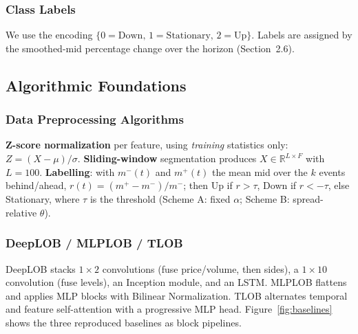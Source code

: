 \documentclass[11pt]{article}
\begin{document}
\subsubsection{Class Labels}
We use the encoding $\{0=\text{Down},\,1=\text{Stationary},\,2=\text{Up}\}$. Labels are assigned by the
smoothed-mid percentage change over the horizon (Section~2.6).

\subsection{Algorithmic Foundations}
\subsubsection{Data Preprocessing Algorithms}
\textbf{Z-score normalization} per feature, using \emph{training} statistics only:
$Z = (X-\mu)/\sigma$.
\textbf{Sliding-window} segmentation produces $X\in\mathbb{R}^{L\times F}$ with $L=100$.
\textbf{Labelling}: with $m^-(t)$ and $m^+(t)$ the mean mid over the $k$ events behind/ahead,
$r(t) = (m^+ - m^-)/m^-$; then Up if $r>\tau$, Down if $r<-\tau$, else Stationary, where $\tau$ is the
threshold (Scheme A: fixed $\alpha$; Scheme B: spread-relative $\theta$).

\subsubsection{DeepLOB / MLPLOB / TLOB}
DeepLOB stacks $1\times2$ convolutions (fuse price/volume, then sides), a $1\times10$ convolution (fuse
levels), an Inception module, and an LSTM. MLPLOB flattens and applies MLP blocks with Bilinear
Normalization. TLOB alternates temporal and feature self-attention with a progressive MLP head.
Figure~\ref{fig:baselines} shows the three reproduced baselines as block pipelines.
\end{document}
